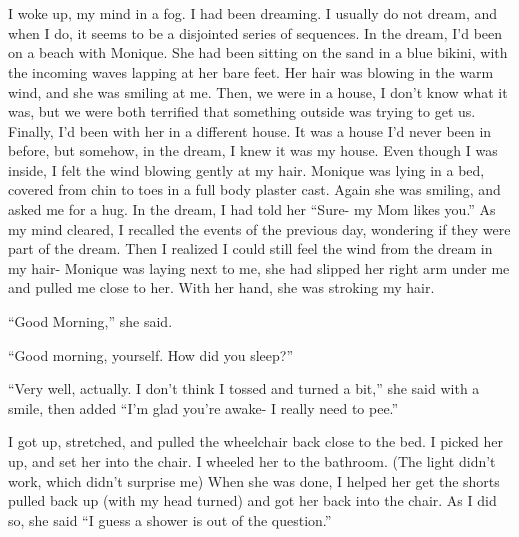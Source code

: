 \chapter{~}
I woke up, my mind in a fog. I had been dreaming. I usually do not dream, and when I do, it
seems to be a disjointed series of sequences. In the dream, I'd been on a beach with Monique.
She had been sitting on the sand in a blue bikini, with the incoming waves lapping at her bare
feet. Her hair was blowing in the warm wind, and she was smiling at me. Then, we were in a
house, I don't know what it was, but we were both terrified that something outside was trying to
get us. Finally, I'd been with her in a different house. It was a house I'd never been in
before, but somehow, in the dream, I knew it was my house. Even though I was inside, I felt the
wind blowing gently at my hair. Monique was lying in a bed, covered from chin to toes in a full
body plaster cast. Again she was smiling, and asked me for a hug. In the dream, I had told her
``Sure- my Mom likes you.'' As my mind cleared, I recalled the events of the previous day,
wondering if they were part of the dream. Then I realized I could still feel the wind from the
dream in my hair- Monique was laying next to me, she had slipped her right arm under me and
pulled me close to her. With her hand, she was stroking my hair.

``Good Morning,'' she said. 

``Good morning, yourself. How did you sleep?''

``Very well, actually. I don't think I tossed and turned a bit,'' she said with a smile,
then added ``I'm glad you're awake- I really need to pee.''

I got up, stretched, and pulled the wheelchair back close to the bed. I picked her up, and
set her into the chair. I wheeled her to the bathroom. (The light didn't work, which didn't
surprise me) When she was done, I helped her get the shorts pulled back up (with my head turned)
and got her back into the chair. As I did so, she said ``I guess a shower is out of the
question.''

